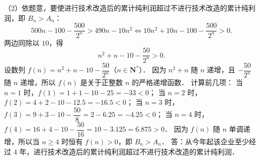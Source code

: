 \begin{answer}
（2）依题意，要使进行技术改造后的累计纯利润超过不进行技术改造的累计纯利润，即 $B_n > A_n$：
\nopagebreak[4]
\[
500n - 100 - \frac{500}{2^n} > 490n - 10n^2 \iff 10n^2 + 10n - 100 - \frac{500}{2^n} > 0.
\]
两边同除以 $10$，得
\nopagebreak[4]
\[
n^2 + n - 10 - \frac{50}{2^n} > 0.
\]
设数列 $f(n) = n^2 + n - 10 - \dfrac{50}{2^n}$（$n \in \mathbf{N}^*$）．
因为 $n^2 + n$ 随 $n$ 递增，且 $-\dfrac{50}{2^n}$ 随 $n$ 递增，所以 $f(n)$ 是关于正整数 $n$ 的严格递增函数．
计算前几项：
当 $n = 1$ 时，$f(1) = 1 + 1 - 10 - 25 = -33 < 0$；
当 $n = 2$ 时，$f(2) = 4 + 2 - 10 - 12.5 = -16.5 < 0$；
当 $n = 3$ 时，$f(3) = 9 + 3 - 10 - \dfrac{50}{8} = 2 - 6.25 = -4.25 < 0$；
当 $n = 4$ 时，$f(4) = 16 + 4 - 10 - \dfrac{50}{16} = 10 - 3.125 = 6.875 > 0$．
因为 $f(n)$ 随 $n$ 单调递增，所以当 $n \geqslant 4$ 时恒有 $f(n) > 0$，即 $B_n > A_n$．
答：从今年起该企业至少经过 $4$ 年，进行技术改造后的累计纯利润超过不进行技术改造的累计纯利润．


\end{answer}
